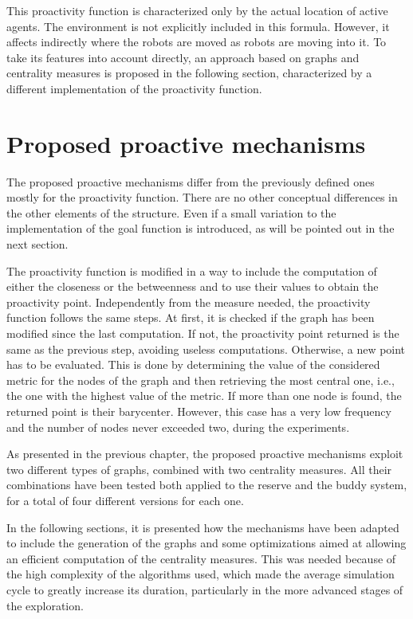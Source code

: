 This proactivity function is characterized only by the actual location
of active agents. The environment is not explicitly included in this
formula. However, it affects indirectly where the robots are moved 
as robots are moving into it. To take its features into account directly, 
an approach based on graphs and centrality measures is proposed in the following section, 
characterized by a different implementation of the proactivity function. 

\section{Proposed proactive mechanisms}

The proposed proactive mechanisms differ from the previously defined
ones mostly for the proactivity function. There are no other conceptual
differences in the other elements of the structure. Even if a small
variation to the implementation of the goal function is introduced,
as will be pointed out in the next section.

The proactivity function is modified in a way to include the computation
of either the closeness or the betweenness and to use their values
to obtain the proactivity point. Independently from the measure needed,
the proactivity function follows the same steps. At first, it is checked
if the graph has been modified since the last computation. If not,
the proactivity point returned is the same as the previous step, avoiding
useless computations. Otherwise, a new point has to be evaluated.
This is done by determining the value of the considered metric for
the nodes of the graph and then retrieving the most central one, i.e.,
the one with the highest value of the metric. If more than one node
is found, the returned point is their barycenter. However, this case
has a very low frequency and the number of nodes never exceeded two,
during the experiments. 

As presented in the previous chapter, the proposed proactive mechanisms
exploit two different types of graphs, combined with two centrality
measures. All their combinations have been tested both applied to
the reserve and the buddy system, for a total of four different versions
for each one. 

In the following sections, it is presented how the mechanisms have
been adapted to include the generation of the graphs and some optimizations
aimed at allowing an efficient computation of the centrality measures.
This was needed because of the high complexity of the algorithms used,
which made the average simulation cycle to greatly increase its duration,
particularly in the more advanced stages of the exploration. 

